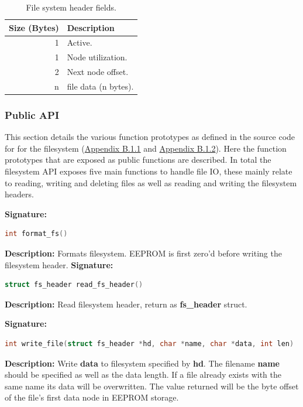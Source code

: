 \begin{table}[H]
\centering
\begin{tabular}{|r|l|}
\hline
\multicolumn{1}{|l|}{\textbf{Size (Bytes)}} & \textbf{Description} \\ \hline
1 & Active. \\ \hline
1 & Node utilization. \\ \hline
2 & Next node offset.\\ \hline
n & file data (n bytes).\\ \hline

\end{tabular}
\caption{File system header fields.}
\label{tbl:HWSWRequirements}
\end{table}
\subsubsection{Public API}
This section details the various function prototypes as defined in the source code for for the filesystem (\hyperref[sec:fsh]{Appendix B.1.1} and \hyperref[sec:fscpp]{Appendix B.1.2}). Here the function prototypes that are exposed as public functions are described. In total the filesystem API exposes five main functions to handle file IO, these mainly relate to reading, writing and deleting files as well as reading and writing the filesystem headers.



\textbf{Signature: } 
\begin{lstlisting}[language=C]
int format_fs()
\end{lstlisting}
\textbf{Description: }  \linebreak
Formats filesystem. EEPROM is first zero'd before writing the filesystem header.
\clearpage
\textbf{Signature: } 
\begin{lstlisting}[language=C]
struct fs_header read_fs_header()
\end{lstlisting}
\textbf{Description: }  \linebreak
Read filesystem header, return as \textbf{fs\_header} struct.

\textbf{Signature: } 
\begin{lstlisting}[language=C]
int write_file(struct fs_header *hd, char *name, char *data, int len)
\end{lstlisting}
\textbf{Description: }  \linebreak
Write \textbf{data} to filesystem specified by \textbf{hd}. The filename \textbf{name} should be specified as well as the data length. If a file already exists with the same name its data will be overwritten. The value returned will be the byte offset of the file's first data node in EEPROM storage.

